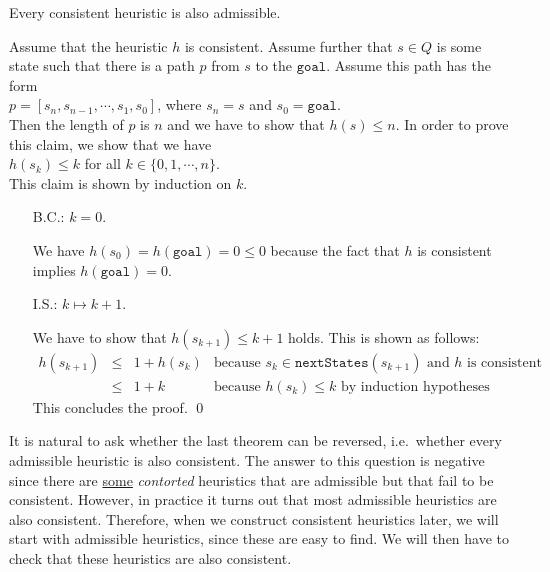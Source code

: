 \begin{Theorem}
  Every consistent heuristic is also admissible. 
\end{Theorem}

\proof
Assume that the heuristic $h$ is consistent.  Assume further that $s \in Q$ is some state such that there is a
path $p$ from $s$ to the $\mathtt{goal}$.  Assume this path has the form
\\[0.2cm]
\hspace*{1.3cm}
$p = [s_n, s_{n-1}, \cdots, s_1, s_0]$, \quad where $s_n = s$ and $s_0 = \mathtt{goal}$.
\\[0.2cm]
Then the length of $p$ is $n$ and we have to show that $h(s) \leq n$.  In order to prove this claim, we show
that we have
\\[0.2cm]
\hspace*{1.3cm}
$h(s_k) \leq k$ \quad for all $k \in \{0, 1, \cdots, n\}$.
\\[0.2cm]
This claim is shown by induction on $k$.
\begin{enumerate}
\item[B.C.:] $k=0$.

             We have $h(s_0) = h(\mathtt{goal}) = 0 \leq 0$ because the fact that $h$ is consistent implies 
             $h(\mathtt{goal}) = 0$. 
\item[I.S.:] $k \mapsto k+1$.
  
             We have to show that $h(s_{k+1}) \leq k + 1$ holds.  This is shown as follows:
             \\[0.2cm]
             \hspace*{1.3cm}
             $
             \begin{array}{lcll}
               h(s_{k+1}) & \leq & 1 + h(s_k) & \mbox{because $s_k \in \mathtt{nextStates}(s_{k+1})$ and $h$ is consistent} \\[0.2cm]
                         & \leq & 1 + k      & \mbox{because $h(s_k) \leq k$ by induction hypotheses}
             \end{array}
             $
             \\[0.2cm]
             This concludes the proof.  \qed
\end{enumerate}

It is natural to ask whether the last theorem can be reversed, i.e.~whether every admissible heuristic is also
consistent.  The answer to this question is negative since there are
\href{http://web.cs.du.edu/~sturtevant/papers/incnew.pdf}{some} \emph{\color{red}contorted}
heuristics that are admissible but that fail to be consistent.  However, in practice it turns out that most 
admissible heuristics are also consistent.  Therefore, when we construct consistent heuristics later, we will
start with admissible heuristics, since these are easy to find.  We will then have to check that these 
heuristics are also consistent.  

